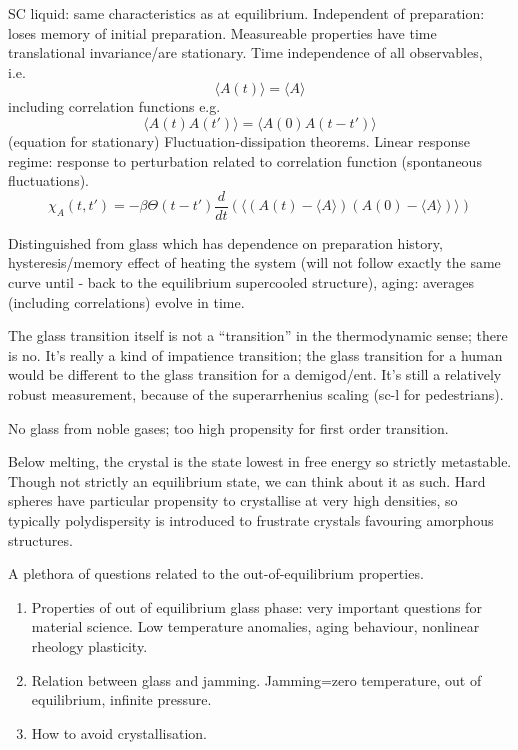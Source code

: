 SC liquid: same characteristics as at equilibrium.
Independent of preparation: loses memory of initial preparation.
Measureable properties have time translational invariance/are stationary.
Time independence of all observables, i.e.\
\begin{equation}
  \langle A(t) \rangle = \langle A \rangle
\end{equation}
including correlation functions e.g.\
\begin{equation}
  \langle A(t) A(t') \rangle = \langle A(0) A(t - t') \rangle
\end{equation}
(equation for stationary)
Fluctuation-dissipation theorems.
Linear response regime: response to perturbation related to correlation function (spontaneous fluctuations).
\begin{equation}
  \chi_A (t, t')
  =
  - \beta \Theta(t - t')
  \frac{d}{dt}
  \left(
  \bigg\langle
  (A(t) - \langle A \rangle)
  (A(0) - \langle A \rangle)
  \bigg\rangle
  \right)
\end{equation}

Distinguished from glass which has dependence on preparation history, hysteresis/memory effect of heating the system (will not follow exactly the same curve until - back to the equilibrium supercooled structure), aging: averages (including correlations) evolve in time.

The glass transition itself is not a ``transition'' in the thermodynamic sense; there is no.
It's really a kind of impatience transition; the glass transition for a human would be different to the glass transition for a demigod/ent.
It's still a relatively robust measurement, because of the superarrhenius scaling (sc-l for pedestrians).

No glass from noble gases; too high propensity for first order transition.

Below melting, the crystal is the state lowest in free energy so strictly metastable.
Though not strictly an equilibrium state, we can think about it as such.
Hard spheres have particular propensity to crystallise at very high densities, so typically polydispersity is introduced to frustrate crystals favouring amorphous structures.

A plethora of questions related to the out-of-equilibrium properties.
\begin{enumerate}
\item Properties of out of equilibrium glass phase: very important questions for material science. Low temperature anomalies, aging behaviour, nonlinear rheology  plasticity.
\item Relation between glass and jamming. Jamming=zero temperature, out of equilibrium, infinite pressure.
\item How to avoid crystallisation.
\end{enumerate}



